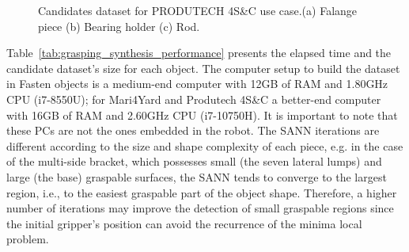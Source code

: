 \begin{figure}[h!]
{\begin{tcolorbox}
\begin{subfigure}[c]{.125\textwidth}
          \caption{}
          \label{fig:rod_candidates}
      \end{subfigure}
     \end{tcolorbox}
     \caption{Candidates dataset for PRODUTECH 4S\&C use case.(a) Falange piece (b) Bearing holder (c) Rod.}
     \label{fig:obj_candiudates_produtech}
   }%
 \end{figure}

Table~\ref{tab:grasping_synthesis_performance} presents the elapsed time and the candidate dataset's size for each object. The computer setup to build the dataset in Fasten objects is a medium-end computer with 12GB of RAM and 1.80GHz CPU (i7-8550U); for Mari4Yard and Produtech 4S\&C a better-end computer with 16GB of RAM and 2.60GHz CPU (i7-10750H). It is important to note that these PCs are not the ones embedded in the robot. The \ac{SANN} iterations are different according to the size and shape complexity of each piece, e.g. in the case of the multi-side bracket, which possesses small (the seven lateral lumps) and large (the base) graspable surfaces, the \ac{SANN} tends to converge to the largest region, i.e., to the easiest graspable part of the object shape. Therefore, a higher number of iterations may improve the detection of small graspable regions since the initial gripper's position can avoid the recurrence of the minima local problem.

